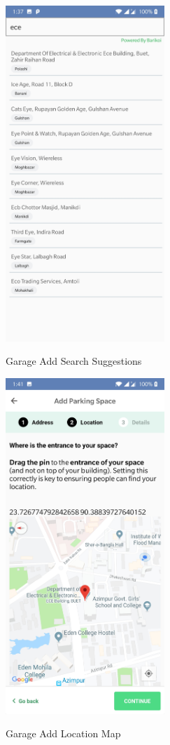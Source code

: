 \documentclass[12pt, english]{article}
\begin{document}
\begin{figure}[h!]
        \begin{minipage}[b]{1\linewidth}
        \centering
        \includegraphics[width=6cm]{GarageAdd/AddressFragment2.jpg}
        \label{arch7}
        \caption{Garage Add Search Suggestions}
        \end{minipage}
\end{figure}
\newpage
\begin{figure}[h!]
        \begin{minipage}[b]{1\linewidth}
        \centering
        \includegraphics[width=6cm]{GarageAdd/Location.jpg}
        \label{arch8}
        \caption{Garage Add Location Map}
        \end{minipage}
\end{figure}
\end{document}
